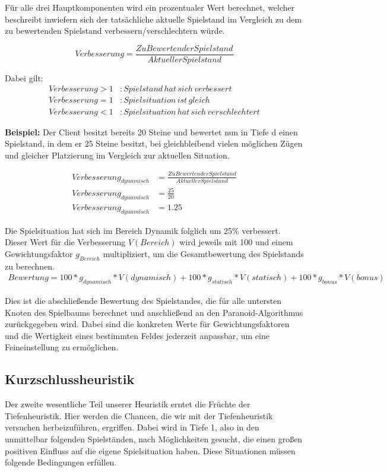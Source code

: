 \documentclass[12pt,a4paper,bibliography=totocnumbered,listof=totocnumbered,ngerman]{scrartcl}
\begin{document}
Für alle drei Hauptkomponenten wird ein prozentualer Wert berechnet, welcher beschreibt inwiefern sich der tatsächliche aktuelle Spielstand im Vergleich zu dem zu bewertenden Spielstand verbessern/verschlechtern würde.

\begin{equation}
 Verbesserung = \frac{ZuBewertenderSpielstand}{AktuellerSpielstand} \nonumber
\end{equation}

Dabei gilt:
\begin{align}
	Verbesserung > 1 &: Spielstand\, hat\, sich\, verbessert \nonumber \\ 
	Verbesserung = 1 &: Spielsituation\, ist\, gleich \nonumber \\
	Verbesserung < 1 &: Spielsituation\, hat\, sich\, verschlechtert \nonumber
\end{align}  

\textbf{Beispiel:}
Der Client besitzt bereits 20 Steine und bewertet nun in Tiefe d einen Spielstand, in dem er 25 Steine besitzt, bei gleichbleibend vielen möglichen Zügen und gleicher Platzierung im Vergleich zur aktuellen Situation. 

\begin{align}
	Verbesserung_{dynamisch} &= \frac{ZuBewertenderSpielstand}{AktuellerSpielstand} \nonumber \\
	Verbesserung_{dynamisch} &= \frac{25}{20} \nonumber \\
	Verbesserung_{dynamisch} &= 1.25 \nonumber
\end{align}

Die Spielsituation hat sich im Bereich Dynamik folglich um 25\% verbessert.\\
Dieser Wert für die Verbesserung $V(Bereich)$ wird jeweils mit 100 und einem Gewichtungsfaktor $g_{Bereich}$ multipliziert, um die Gesamtbewertung des Spielstands zu berechnen.
\begin{align}
Bewertung = 100*g_{dynamisch}*V(dynamisch)+100*g_{statisch}*V(statisch)+100*g_{bonus}*V(bonus)\nonumber
\end{align}

Dies ist die abschließende Bewertung des Spielstandes, die für alle untersten Knoten des Spielbaums berechnet und anschließend an den Paranoid-Algorithmus zurückgegeben wird. Dabei sind die konkreten Werte für Gewichtungsfaktoren und die Wertigkeit eines bestimmten Feldes jederzeit anpassbar, um eine Feineinstellung zu ermöglichen.   

\subsection{Kurzschlussheuristik}
Der zweite wesentliche Teil unserer Heuristik erntet die Früchte der Tiefenheuristik. Hier werden die Chancen, die wir mit der Tiefenheuristik versuchen herbeizuführen, ergriffen. Dabei wird in Tiefe 1, also in den unmittelbar folgenden Spielständen, nach Möglichkeiten gesucht, die einen großen positiven Einfluss auf die eigene Spielsituation haben. Diese Situationen müssen folgende Bedingungen erfüllen.
\end{document}
